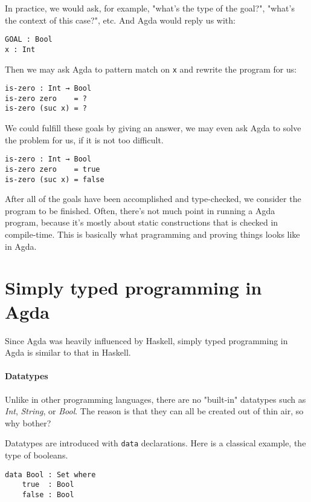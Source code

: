 \documentclass[../thesis.tex]{subfiles}
\begin{document}
In practice, we would ask, for example, "what's the type of the goal?",
 "what's the context of this case?", etc. And Agda would reply us with:

\begin{lstlisting}
GOAL : Bool
x : Int
\end{lstlisting}

Then we may ask Agda to pattern match on {\lstinline|x|} and rewrite the program for us:

\begin{lstlisting}
is-zero : Int → Bool
is-zero zero    = ?
is-zero (suc x) = ?
\end{lstlisting}

We could fulfill these goals by giving an answer, we may even ask Agda to solve
the problem for us, if it is not too difficult.

\begin{lstlisting}
is-zero : Int → Bool
is-zero zero    = true
is-zero (suc x) = false
\end{lstlisting}

After all of the goals have been accomplished and type-checked, we consider the
program to be finished. Often, there's not much point in running a Agda program,
because it's mostly about static constructions that is checked in compile-time.
This is basically what pragramming and proving things looks like in Agda.

\section{Simply typed programming in Agda}

Since Agda was heavily influenced by Haskell, simply typed programming in Agda
is similar to that in Haskell.

\paragraph{Datatypes}

Unlike in other programming languages, there are no "built-in"
datatypes such as \textit{Int}, \textit{String}, or \textit{Bool}.
The reason is that they can all be created out of thin air, so why bother?

Datatypes are introduced with {\lstinline|data|} declarations.
Here is a classical example, the type of booleans.

\begin{lstlisting}
data Bool : Set where
    true  : Bool
    false : Bool
\end{lstlisting}
\end{document}
